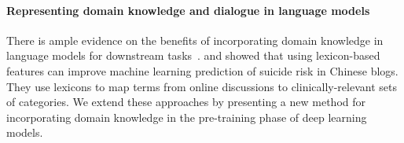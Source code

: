 \documentclass[letterpaper]{article} %
\newcommand{\kibitz}[2]{\ifnum\Comments=1{\textcolor{#1}{#2}}\fi}
\newcommand{\di}[1]{\kibitz{blue}{[DI:#1]}}
\begin{document}

\paragraph{Representing domain knowledge and dialogue in language models}

There is ample evidence on the benefits of incorporating domain knowledge in language models for downstream tasks~\cite{childsEmbeddingDomainKnowledge2019,colon-hernandezCombiningPretrainedLanguage2021}.
\citet{gaurKnowledgeawareAssessmentSeverity2019} and \citet{wangMedicalLevelSuicideRisk2021} showed  that  using lexicon-based features can improve machine learning prediction of suicide risk in Chinese blogs. They use lexicons to map terms from online discussions to clinically-relevant sets of categories.
We extend these approaches by presenting a new method for incorporating domain knowledge in the pre-training phase of deep learning models.
\end{document}
